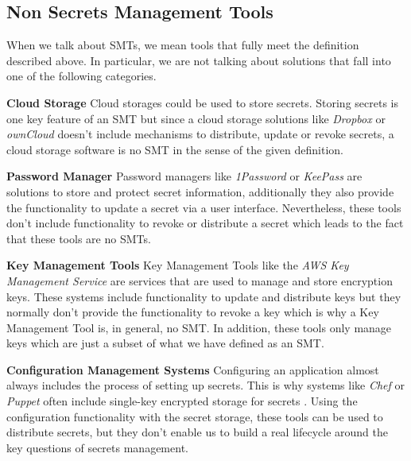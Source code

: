 \documentclass[runningheads]{llncs}
\begin{document}
\subsection{Non Secrets Management Tools}
When we talk about SMTs, we mean tools that fully meet the definition described above. In particular, we are not talking about solutions that fall into one of the following categories.\newline

\noindent
\textbf{Cloud Storage}\newline
Cloud storages could be used to store secrets. Storing secrets is one key feature of an SMT but since a cloud storage solutions like \textit{Dropbox} \cite{ref_url_dropbox} or \textit{ownCloud} \cite{ref_url_owncloud} doesn't include mechanisms to distribute, update or revoke secrets, a cloud storage software is no SMT in the sense of the given definition. \newline

\noindent
\textbf{Password Manager}\newline
Password managers like \textit{1Password} \cite{ref_url_1password} or \textit{KeePass} \cite{ref_url_keepass} are solutions to store and protect secret information, additionally they also provide the functionality to update a secret via a user interface. Nevertheless, these tools don't include functionality to revoke or distribute a secret which leads to the fact that these tools are no SMTs. \newline

\noindent
\textbf{Key Management Tools}\newline
Key Management Tools like the \textit{AWS Key Management Service} \cite{ref_url_aws_sms} are services that are used to manage and store encryption keys. These systems include functionality to update and distribute keys but they normally don't provide the functionality to revoke a key which is why a Key Management Tool is, in general, no SMT. In addition, these tools only manage keys which are just a subset of what we have defined as an SMT.\newline

\noindent
\textbf{Configuration Management Systems}\newline
Configuring an application almost always includes the process of setting up secrets. This is why systems like \textit{Chef} or \textit{Puppet} often include single-key encrypted storage for secrets \cite{vault_vs_chef}. Using the configuration functionality with the secret storage, these tools can be used to distribute secrets, but they don't enable us to build a real lifecycle around the key questions of secrets management. \newline
\end{document}
